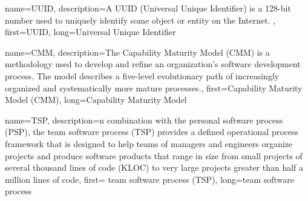 {
    name={UUID},
    description={A UUID (Universal Unique Identifier) is a 128-bit number used to uniquely identify some object or entity on the Internet. },
    first={UUID},
    long={Universal Unique Identifier}
}     

{
    name={CMM},
    description={The Capability Maturity Model (CMM) is a methodology used to develop and refine an organization's software development process. The model describes a five-level evolutionary path of increasingly organized and systematically more mature processes.},
    first={Capability Maturity Model (CMM)},
    long={Capability Maturity Model}
}

{
    name={TSP},
    description={n combination with the personal software process (PSP), the team software process (TSP) provides a defined operational process framework that is designed to help teams of managers and engineers organize projects and produce software products that range in size from small projects of several thousand lines of code (KLOC) to very large projects greater than half a million lines of code},
    first={ team software process (TSP)},
    long={team software process}
}





  
